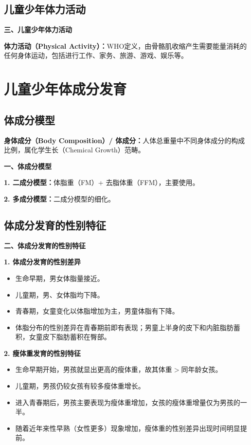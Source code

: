 \subsection{儿童少年体力活动}

\begin{keybox}
\textbf{三、儿童少年体力活动}

\textbf{体力活动（Physical Activity）：}WHO定义，由骨骼肌收缩产生需要能量消耗的任何身体运动，包括进行工作、家务、旅游、游戏、娱乐等。
\end{keybox}

\section{儿童少年体成分发育}

\subsection{体成分模型}

\begin{defbox}
\textbf{身体成分（Body Composition）/ 体成分：}人体总重量中不同身体成分的构成比例，属化学生长（Chemical Growth）范畴。

\textbf{一、体成分模型}

\textbf{1. 二成分模型：}体脂重（FM）+ 去脂体重（FFM），主要使用。

\textbf{2. 多成分模型：}二成分模型的细化。
\end{defbox}

\subsection{体成分发育的性别特征}

\begin{defbox}
\textbf{二、体成分发育的性别特征}

\textbf{1. 体成分发育的性别差异}
\begin{itemize}[leftmargin=*]
    \item 生命早期，男女体脂量接近。
    \item 儿童期，男、女体脂均下降。
    \item 青春期，女童变化以体脂增加为主，男童体脂有下降。
    \item 体脂分布的性别差异在青春期前即有表现；男童上半身的皮下和内脏脂肪蓄积，女童皮下脂肪蓄积在臀部。
\end{itemize}

\textbf{2. 瘦体重发育的性别特征}
\begin{itemize}[leftmargin=*]
    \item 生命早期开始，男孩就显出更高的瘦体重，故其体重$>$同年龄女孩。
    \item 儿童期，男孩仍较女孩有较多瘦体重增长。
    \item 进入青春期后，男孩主要表现为瘦体重增加，女孩的瘦体重增量仅为男孩的一半。
    \item 随着近年来性早熟（女性更多）现象增加，瘦体重的性别差异出现时间明显提前。
\end{itemize}
\end{defbox}

\newpage
